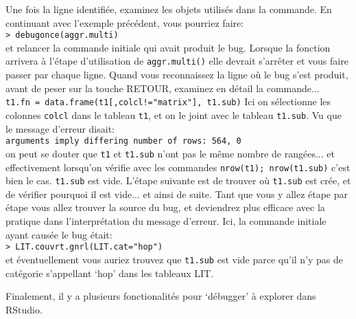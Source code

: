 \documentclass{article}
\begin{document}
Une fois la ligne identifiée, examinez les objets utilisés dans la
commande. En continuant avec l'exemple précédent, vous pourriez
faire:\\
\texttt{> debugonce(aggr.multi)}\\
et relancer la commande initiale qui avait produit le bug. Lorsque la
fonction arrivera à l'étape d'utilisation de \texttt{aggr.multi()}
elle devrait s'arrêter et vous faire passer par chaque ligne. Quand
vous reconnaissez la ligne où le bug s'est produit, avant de peser sur
la touche RETOUR, examinez en détail la commande...
\texttt{ t1.fn = data.frame(t1[,colcl!="matrix"], t1.sub)}
Ici on sélectionne les colonnes \texttt{colcl} dans le tableau
\texttt{t1}, et on le joint avec le tableau \texttt{t1.sub}. Vu que le
message d'erreur disait:\\
\texttt{arguments imply differing number of rows: 564, 0}\\
on peut se douter que \texttt{t1} et \texttt{t1.sub} n'ont pas le même
nombre de rangées... et effectivement lorsqu'on vérifie avec les
commandes \texttt{nrow(t1); nrow(t1.sub)} c'est bien le
cas. \texttt{t1.sub} est vide. L'étape suivante est de trouver où
\texttt{t1.sub} est crée, et de vérifier pourquoi il est vide... et
ainsi de suite. Tant que vous y allez étape par étape vous allez
trouver la source du bug, et deviendrez plus efficace avec la pratique
dans l'interprétation du message d'erreur. Ici, la commande initiale
ayant causée le bug était: \\
\texttt{> LIT.couvrt.gnrl(LIT.cat="hop")}\\
et éventuellement vous auriez trouvez que \texttt{t1.sub} est vide
parce qu'il n'y pas de catégorie s'appellant `hop' dans les tableaux LIT.

Finalement, il y a plusieurs fonctionalités pour `débugger' à explorer
dans RStudio.

\begin{comment}
\section{Informations supplémentaires}
\subsection{Fichiers de code R requis}


\end{comment}
\end{document}
